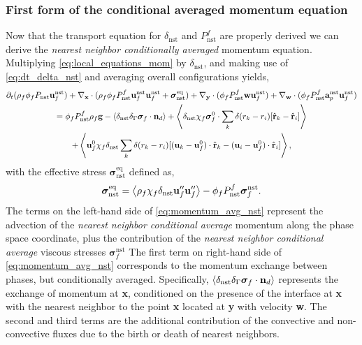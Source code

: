 \subsubsection{First form of the conditional averaged momentum equation}
Now that the transport equation for $\delta_\text{nst}$ and $P_\text{nst}^f$ are properly derived we can derive the \textit{nearest neighbor conditionally averaged} momentum equation. 
Multiplying \ref{eq:local_equations_mom} by $\delta_\text{nst}$, and making use of \ref{eq:dt_delta_nst} and averaging overall configurations yields, 
\begin{multline}
    \pddt (\rho_f\phi_f P_\text{nst} \textbf{u}^\text{nst}_f)
    + \pddx\cdot (
        \rho_f\phi_fP_\text{nst}^f \textbf{u}^\text{nst}_f\textbf{u}^\text{nst}_f 
        +\bm\sigma_\text{nst}^\text{eq})
    + \pddy\cdot (\phi_fP_\text{nst}^f \textbf{w}\textbf{u}_f^\text{nst} )
    + \pddw\cdot (\phi_fP_\text{nst}^f \textbf{a}_p^\text{nst} \textbf{u}_f^\text{nst} )\\
    = 
    \phi_fP_\text{nst}^f  \rho_f \textbf{g}
    - \avg{\delta_\text{nst}\delta_\Gamma \bm\sigma_f \cdot \textbf{n}_d} 
    +\avg{
        \delta_\text{nst}
        \chi_f \bm\sigma_f^0 \cdot
        \sum_k 
        \delta(r_k - r_i)
        [\hat{\textbf{r}}_k - \hat{\textbf{r}}_i]}\\
    +\avg{
         \textbf{u}_f^0\chi_f \delta_\text{nst}
        \sum_k 
        \delta(r_k - r_i)
        [(\textbf{u}_k - \textbf{u}_f^0) \cdot \hat{\textbf{r}}_k - (\textbf{u}_i- \textbf{u}_f^0)  \cdot \hat{\textbf{r}}_i]},
    \label{eq:momentum_avg_nst}
\end{multline}
with the effective stress $\bm\sigma_\text{nst}^\text{eq}$ defined as, 
\begin{equation}
    \bm\sigma_\text{nst}^\text{eq}=
    \left<\rho_f\chi_f\delta_\text{nst} \textbf{u}''_f\textbf{u}''_f\right> 
    - \phi_f P_\text{nst}^f \bm\sigma^\text{nst}_f. 
\end{equation}
The terms on the left-hand side of \ref{eq:momentum_avg_nst} represent the advection of the \textit{nearest neighbor conditional average} momentum along the phase space coordinate, plus the contribution of the \textit{nearest neighbor conditional average} viscous stresses $\bm\sigma^\text{nst}_f$
The first term on right-hand side of \ref{eq:momentum_avg_nst} corresponds to the momentum exchange between phases, but conditionally averaged. 
Specifically, $\left<\delta_\text{nst}\delta_\Gamma \bm\sigma_f \cdot \textbf{n}_d\right> $ represents the exchange of momentum at \textbf{x}, conditioned on the presence of the interface at \textbf{x} with the nearest neighbor to the point \textbf{x} located at \textbf{y} with velocity \textbf{w}.
The second and third terms are the additional contribution of the convective and non-convective fluxes due to the birth or death of nearest neighbors. 

